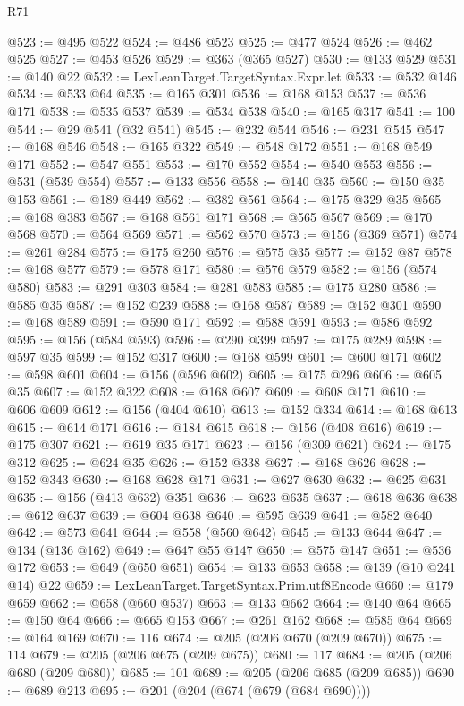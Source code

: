 \begin{lexlean}{R71}
\begin{coremodule}
@523 := @495 @522
@524 := @486 @523
@525 := @477 @524
@526 := @462 @525
@527 := @453 @526
@529 := @363 (@365 @527)
@530 := @133 @529
@531 := @140 @22
@532 := LexLeanTarget.TargetSyntax.Expr.let
@533 := @532 @146
@534 := @533 @64
@535 := @165 @301
@536 := @168 @153
@537 := @536 @171
@538 := @535 @537
@539 := @534 @538
@540 := @165 @317
@541 := 100
@544 := @29 @541 (@32 @541)
@545 := @232 @544
@546 := @231 @545
@547 := @168 @546
@548 := @165 @322
@549 := @548 @172
@551 := @168 @549 @171
@552 := @547 @551
@553 := @170 @552
@554 := @540 @553
@556 := @531 (@539 @554)
@557 := @133 @556
@558 := @140 @35
@560 := @150 @35 @153
@561 := @189 @449
@562 := @382 @561
@564 := @175 @329 @35
@565 := @168 @383
@567 := @168 @561 @171
@568 := @565 @567
@569 := @170 @568
@570 := @564 @569
@571 := @562 @570
@573 := @156 (@369 @571)
@574 := @261 @284
@575 := @175 @260
@576 := @575 @35
@577 := @152 @87
@578 := @168 @577
@579 := @578 @171
@580 := @576 @579
@582 := @156 (@574 @580)
@583 := @291 @303
@584 := @281 @583
@585 := @175 @280
@586 := @585 @35
@587 := @152 @239
@588 := @168 @587
@589 := @152 @301
@590 := @168 @589
@591 := @590 @171
@592 := @588 @591
@593 := @586 @592
@595 := @156 (@584 @593)
@596 := @290 @399
@597 := @175 @289
@598 := @597 @35
@599 := @152 @317
@600 := @168 @599
@601 := @600 @171
@602 := @598 @601
@604 := @156 (@596 @602)
@605 := @175 @296
@606 := @605 @35
@607 := @152 @322
@608 := @168 @607
@609 := @608 @171
@610 := @606 @609
@612 := @156 (@404 @610)
@613 := @152 @334
@614 := @168 @613
@615 := @614 @171
@616 := @184 @615
@618 := @156 (@408 @616)
@619 := @175 @307
@621 := @619 @35 @171
@623 := @156 (@309 @621)
@624 := @175 @312
@625 := @624 @35
@626 := @152 @338
@627 := @168 @626
@628 := @152 @343
@630 := @168 @628 @171
@631 := @627 @630
@632 := @625 @631
@635 := @156 (@413 @632) @351
@636 := @623 @635
@637 := @618 @636
@638 := @612 @637
@639 := @604 @638
@640 := @595 @639
@641 := @582 @640
@642 := @573 @641
@644 := @558 (@560 @642)
@645 := @133 @644
@647 := @134 (@136 @162)
@649 := @647 @55 @147
@650 := @575 @147
@651 := @536 @172
@653 := @649 (@650 @651)
@654 := @133 @653
@658 := @139 (@10 @241 @14) @22
@659 := LexLeanTarget.TargetSyntax.Prim.utf8Encode
@660 := @179 @659
@662 := @658 (@660 @537)
@663 := @133 @662
@664 := @140 @64
@665 := @150 @64
@666 := @665 @153
@667 := @261 @162
@668 := @585 @64
@669 := @164 @169
@670 := 116
@674 := @205 (@206 @670 (@209 @670))
@675 := 114
@679 := @205 (@206 @675 (@209 @675))
@680 := 117
@684 := @205 (@206 @680 (@209 @680))
@685 := 101
@689 := @205 (@206 @685 (@209 @685))
@690 := @689 @213
@695 := @201 (@204 (@674 (@679 (@684 @690))))

\end{coremodule}
\end{lexlean}
